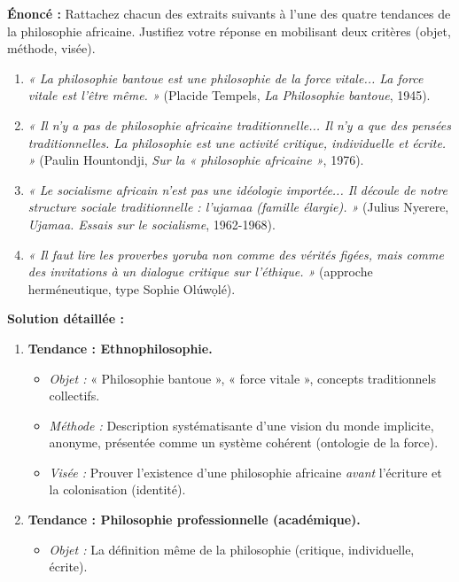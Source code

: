 \documentclass[11pt]{article}
\begin{document}
\begin{exoresolu}
\textbf{Énoncé :} Rattachez chacun des extraits suivants à l'une des quatre tendances de la philosophie africaine. Justifiez votre réponse en mobilisant deux critères (objet, méthode, visée).
\begin{enumerate}
    \item \emph{« La philosophie bantoue est une philosophie de la force vitale... La force vitale est l'être même. »} (Placide Tempels, \emph{La Philosophie bantoue}, 1945).
    \item \emph{« Il n'y a pas de philosophie africaine traditionnelle... Il n'y a que des pensées traditionnelles. La philosophie est une activité critique, individuelle et écrite. »} (Paulin Hountondji, \emph{Sur la « philosophie africaine »}, 1976).
    \item \emph{« Le socialisme africain n'est pas une idéologie importée... Il découle de notre structure sociale traditionnelle : l'ujamaa (famille élargie). »} (Julius Nyerere, \emph{Ujamaa. Essais sur le socialisme}, 1962-1968).
    \item \emph{« Il faut lire les proverbes yoruba non comme des vérités figées, mais comme des invitations à un dialogue critique sur l'éthique. »} (approche herméneutique, type Sophie Olúwọlé).
\end{enumerate}
\tcblower
\textbf{Solution détaillée :}
\begin{enumerate}
    \item \textbf{Tendance : Ethnophilosophie.}
        \begin{itemize}
            \item \textit{Objet :} « Philosophie bantoue », « force vitale », concepts traditionnels collectifs.
            \item \textit{Méthode :} Description systématisante d'une vision du monde implicite, anonyme, présentée comme un système cohérent (ontologie de la force).
            \item \textit{Visée :} Prouver l'existence d'une philosophie africaine \emph{avant} l'écriture et la colonisation (identité).
        \end{itemize}
    \item \textbf{Tendance : Philosophie professionnelle (académique).}
        \begin{itemize}
            \item \textit{Objet :} La définition même de la philosophie (critique, individuelle, écrite).

\end{itemize}
\end{enumerate}
\end{exoresolu}
\end{document}
